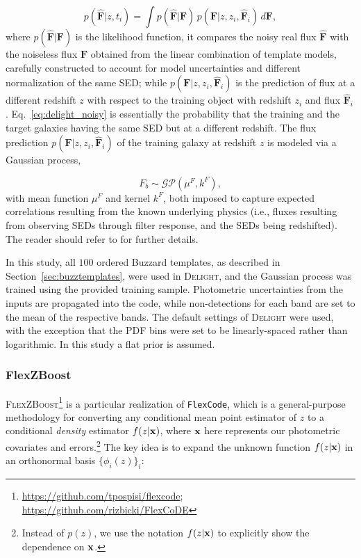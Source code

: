 \begin{equation} \label{eq:delight_noisy}
p(\mathbf{\hat{F}}|z,t_i) = \int p(\mathbf{\hat{F}}|\mathbf{F})\, p(\mathbf{F}|z,z_i,\mathbf{\hat{F}}_i)\, d\mathbf{F},
\end{equation}
where $p(\mathbf{\hat{F}}|\mathbf{F})$ is the likelihood function, it compares the noisy real flux $\mathbf{\hat{F}}$ with the noiseless flux $\mathbf{F}$ obtained from the linear combination of template models, carefully constructed to account for model uncertainties and different normalization of the same SED; while $p(\mathbf{F}|z,z_i,\mathbf{\hat{F}}_i)$ is the prediction of flux at a different redshift $z$ with respect to the training object with redshift $z_i$ and flux $\mathbf{\hat{F}}_i$. Eq.~\ref{eq:delight_noisy} is essentially the probability that the training and the target galaxies having the same SED but at a different redshift. The flux prediction $p(\mathbf{F}|z,z_i,\mathbf{\hat{F}}_i)$ of the training galaxy at redshift $z$ is modeled via a Gaussian process,

\begin{equation} \label{eq:delight_gp}
F_b \sim \mathcal{GP}\left( \mu^F,k^F \right),
\end{equation}
\noindent with mean function $\mu^F$ and kernel $k^F$, both imposed to capture expected correlations resulting from the known underlying physics (i.e., fluxes resulting from observing SEDs through filter response, and the SEDs being redshifted). The reader should refer to \citet{Leistedt:17} for further details.

In this study, all $100$ ordered Buzzard templates, as described in Section~\ref{sec:buzztemplates}, were used in \textsc{Delight}, and the Gaussian process was trained using the provided training sample. Photometric uncertainties from the inputs are propagated into the code, while non-detections for each band are set to the mean of the respective bands. The default settings of \textsc{Delight} were used, with the exception that the PDF bins were set to be linearly-spaced rather than logarithmic. In this study a flat prior is assumed.


\subsubsection{FlexZBoost}
\label{sec:flexzboost}

\textsc{FlexZBoost}\footnote{\url{https://github.com/tpospisi/flexcode};\\ \url{https://github.com/rizbicki/FlexCoDE}} \citep{Izbicki:17} is a particular realization of \texttt{FlexCode}, which is a general-purpose methodology for converting any conditional mean point estimator of $z$ to a conditional {\em density} estimator $f(z \vert {\mathbf{x}})$, where ${\mathbf{x}}$ here represents our photometric covariates and errors.\footnote{Instead of $p(z)$, we use the notation $f(z \vert {\mathbf{x}})$ to explicitly show the dependence on ${\mathbf{x}}$.} The key idea is to expand the unknown function $f(z \vert {\mathbf{x}})$ in an orthonormal basis $\{\phi_i(z)\}_{i}$:

